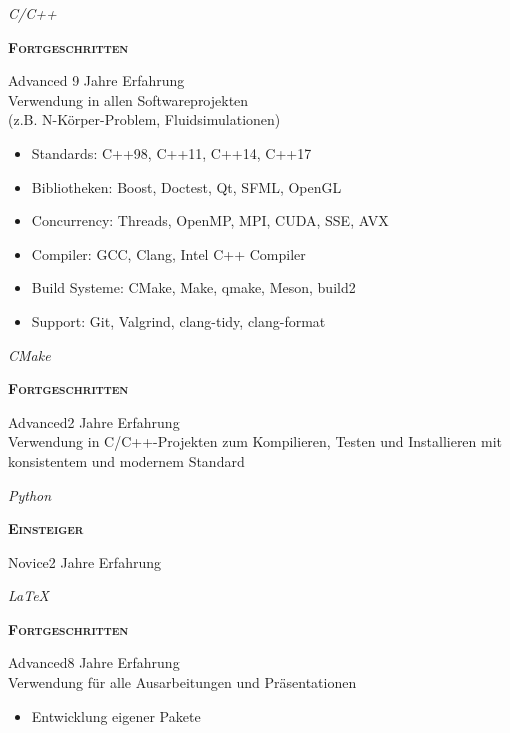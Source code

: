 \documentclass[8pt]{article}
\newenvironment{cvItemize}{%
  \begin{itemize}[itemsep=0mm, leftmargin=4mm]
}{%
  \end{itemize}
}
\newenvironment{cvSkillItem}[2]{
  \par
  \begin{minipage}[c]{0.2\linewidth}
    \raggedleft
    \normalfont
    \sffamily
    \itshape
    #1
  \end{minipage}
  \hspace{0.02\linewidth}
  \vrule
  \hspace{0.02\linewidth}
  \begin{minipage}[t]{0.74\linewidth}
    \sffamily\textsc{\color{cvColor} \textbf{#2}}\par
    \normalfont\footnotesize\sffamily\color{cvContentColor}
}{
  \end{minipage}
  \par%
  \vspace{\baselineskip}%
}
\begin{document}
      \begin{multicols}{2}
        \begin{cvSkillItem}{C/C++}{Fortgeschritten}
          Advanced \hfill 9 Jahre Erfahrung \\[1pt]
          Verwendung in allen Softwareprojekten \\
          (z.B. N-Körper-Problem, Fluidsimulationen)
          \begin{cvItemize}
            \item Standards: C++98, C++11, C++14, C++17
            \item Bibliotheken: Boost, Doctest, Qt, SFML, OpenGL
            \item Concurrency: Threads, OpenMP, MPI, CUDA, SSE, AVX
            \item Compiler: GCC, Clang, Intel C++ Compiler
            \item Build Systeme: CMake, Make, qmake, Meson, build2
            \item Support: Git, Valgrind, clang-tidy, clang-format
          \end{cvItemize}
        \end{cvSkillItem}

        \begin{cvSkillItem}{CMake}{Fortgeschritten}
          Advanced\hfill 2 Jahre Erfahrung \\[1pt]
          Verwendung in C/C++-Projekten zum Kompilieren, Testen und Installieren mit konsistentem und modernem Standard
        \end{cvSkillItem}
        \begin{cvSkillItem}{Python}{Einsteiger}
          Novice\hfill 2 Jahre Erfahrung
        \end{cvSkillItem}
        \begin{cvSkillItem}{LaTeX}{Fortgeschritten}
          Advanced\hfill 8 Jahre Erfahrung\\[1pt]
          Verwendung für alle Ausarbeitungen und Präsentationen
          \begin{cvItemize}
            \item Entwicklung eigener Pakete
          \end{cvItemize}
        \end{cvSkillItem}
      \end{multicols}
\end{document}
